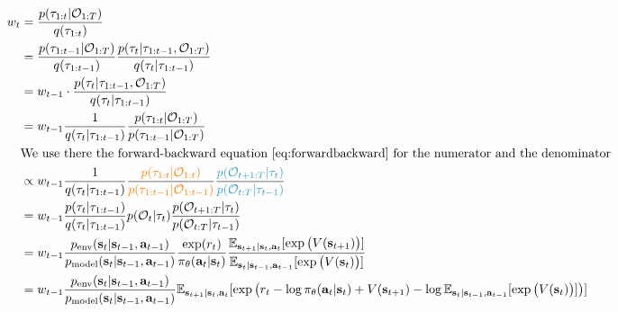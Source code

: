 \label{app:rec_weights}
\begin{align}
w_t &= \frac{p(\traj_{1:t} | \gO_{1:T})}{q(\traj_{1:t})} \nonumber\\
&= \frac{p(\traj_{1:t-1} | \gO_{1:T})}{q(\traj_{1:t-1})}\frac{p(\traj_t |\traj_{1:t-1}, \gO_{1:T})}{q(\traj_t | \traj_{1:t-1})} \nonumber\\
&= w_{t-1} \cdot \frac{p(\traj_t |\traj_{1:t-1}, \gO_{1:T})}{q(\traj_t | \traj_{1:t-1})} \nonumber\\
&= w_{t-1} \frac{1}{ q(\traj_t | \traj_{1:t-1})} \frac{p(\traj_{1:t} | \gO_{1:T})}{ p(\traj_{1:t-1} | \gO_{1:T})} \nonumber\\
&\text{We use there the forward-backward equation~\ref{eq:forwardbackward} for the numerator and the denominator} \nonumber\\
 &\propto w_{t-1}   \frac{1}{ q(\traj_t | \traj_{1:t-1})} \frac{ \textcolor{orange}{p(\traj_{1:t} | \gO_{1:t})}}{ \textcolor{orange}{p(\traj_{1:t-1} | \gO_{1:t-1})}} \frac{ \textcolor{beta}{p(\gO_{t+1:T} | \traj_{t})}}{ \textcolor{beta}{p(\gO_{t:T} | \traj_{t-1})}}   \nonumber\\
&= w_{t-1}   \frac{ p(\traj_t | \traj_{1:t-1})}{ q(\traj_t | \traj_{1:t-1})}  p(\gO_t | \traj_t)   \frac{ p(\gO_{t+1:T} | \traj_{t})}{ p(\gO_{t:T} | \traj_{t-1})}  \nonumber\\
&= w_{t-1}    \frac{\penv(\rvs_{t} | \rvs_{t-1}, \rva_{t-1})}{ \pmodel(\rvs_{t} | \rvs_{t-1}, \rva_{t-1}) }   \frac{\exp (r_t)}{\pi_\parampol(\rva_t|\rvs_t)} \frac{\E_{\rvs_{t+1} | \rvs_t, \rva_t} [ \exp \big( V(\rvs_{t+1}) \big)] }{\E_{\rvs_{t} | \rvs_{t-1}, \rva_{t-1}} [ \exp \big( V(\rvs_{t}) \big)]}  \nonumber\\
&= w_{t-1} \frac{\penv(\rvs_{t} | \rvs_{t-1}, \rva_{t-1})}{ \pmodel(\rvs_{t} | \rvs_{t-1}, \rva_{t-1}) }  \E_{\rvs_{t+1} | \rvs_t, \rva_t} [ \exp \big( r_t  -  \log \pi_\parampol(\rva_t | \rvs_t) + V(\rvs_{t+1}) - \log \E_{\rvs_{t} | \rvs_{t-1}, \rva_{t-1}} [ \exp \big( V(\rvs_{t}) \big)] \big)]
\end{align}



